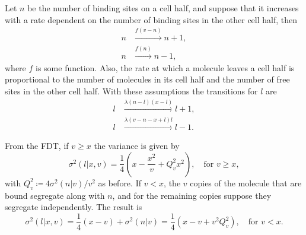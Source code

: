 Let $n$ be the number of binding sites on a cell half, and suppose that it increases with a rate dependent on the number of binding sites in the other cell half, then
\begin{equation*}
  \begin{split}
    n&\xrightarrow{f(v-n)}n+1,\\
    n&\xrightarrow{f(n)}n-1,
  \end{split}
\end{equation*}
where $f$ is some function. Also, the rate at which a molecule leaves a cell half is proportional to the number of molecules in its cell half and the number of free sites in the other cell half. With these assumptions the transitions for $l$ are
\begin{equation*}
  \begin{split}
    l&\xrightarrow{\lambda(n-l)(x-l)}l+1,\\
    l&\xrightarrow{\lambda(v-n-x+l)l}l-1.
  \end{split}
\end{equation*}

From the FDT, if $v\geq x$ the variance is given by
\begin{equation*}
  \sigma^2(l|x,v) =\frac{1}{4}\left(x-\frac{x^2}{v}+Q_v^2x^2\right),\quad \text{for } v\geq x,
\end{equation*}
with $Q_v^2 \coloneqq 4\sigma^2(n|v)/v^2$ as before. If $v<x$, the $v$ copies of the molecule that are bound segregate along with $n$, and for the remaining copies suppose they segregate independently. The result is
\begin{equation*}
  \sigma^2(l|x,v) = \frac{1}{4}(x-v) + \sigma^2(n|v) = \frac{1}{4}\left(x-v+v^2Q_v^2\right),\quad \text{for } v<x.
\end{equation*}

